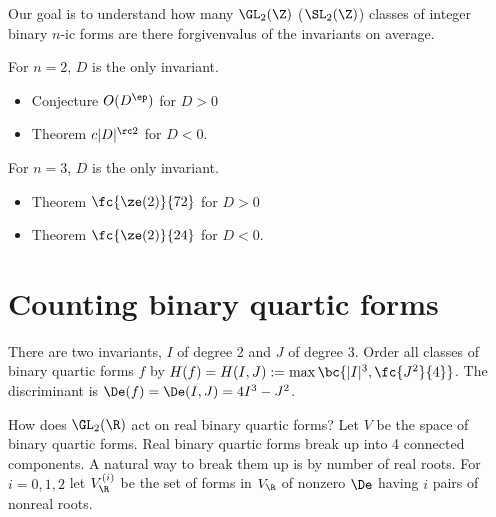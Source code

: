 

Our goal is to understand how many $\GL_2(\Z)$ ($\SL_2(\Z)$) classes of integer binary $n$-ic forms are there forgivenvalus of the invariants on average.

For $n=2$, $D$ is the only invariant.
\begin{itemize}
\item
Conjecture $O(D^\ep)$ for $D>0$
\item
Theorem $c|D|^{\rc 2}$ for $D<0$.
\end{itemize}
For $n=3$, $D$ is the only invariant.
\begin{itemize}
\item
Theorem $\fc{\ze(2)}{72}$ for $D>0$
\item
Theorem $\fc{\ze(2)}{24}$ for $D<0$.
\end{itemize}

\section{Counting binary quartic forms}

There are two invariants, $I$ of degree 2 and $J$ of degree 3. Order all classes of binary quartic forms $f$ by $H(f)=H(I,J):=\max\bc{|I|^3,\fc{J^2}{4}}$. The discriminant is  $\De(f)= \De(I,J) = 4I^3 - J^2$.

How does $\GL_2(\R)$ act on real binary quartic forms?
Let $V$ be the space of binary quartic forms.
Real binary quartic forms break up into 4 connected components.
A natural way to break them up is by number of real roots. For $i=0,1,2$ let $V_{\R}^{(i)}$ be the set of forms in $V_\R$ of nonzero $\De$ having $i$ pairs of nonreal roots. 

